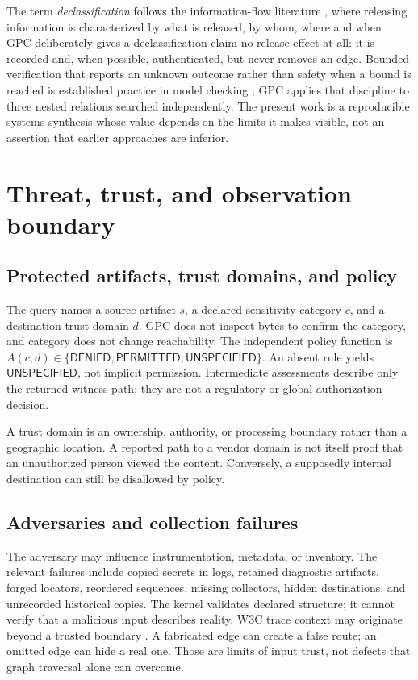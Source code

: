 \documentclass[11pt,letterpaper]{article}
\begin{document}
The term \emph{declassification} follows the information-flow literature \cite{denning,sabelfeldmyers}, where releasing information is characterized by what is released, by whom, where and when \cite{sabelfeldsands}. GPC deliberately gives a declassification claim no release effect at all: it is recorded and, when possible, authenticated, but never removes an edge. Bounded verification that reports an unknown outcome rather than safety when a bound is reached is established practice in model checking \cite{bmc}; GPC applies that discipline to three nested relations searched independently. The present work is a reproducible systems synthesis whose value depends on the limits it makes visible, not an assertion that earlier approaches are inferior.

\section{Threat, trust, and observation boundary}
\subsection{Protected artifacts, trust domains, and policy}
The query names a source artifact \(s\), a declared sensitivity category \(c\), and a destination trust domain \(d\). GPC does not inspect bytes to confirm the category, and category does not change reachability. The independent policy function is \(A(c,d)\in\{\mathsf{DENIED},\mathsf{PERMITTED},\mathsf{UNSPECIFIED}\}\). An absent rule yields \(\mathsf{UNSPECIFIED}\), not implicit permission. Intermediate assessments describe only the returned witness path; they are not a regulatory or global authorization decision.

A trust domain is an ownership, authority, or processing boundary rather than a geographic location. A reported path to a vendor domain is not itself proof that an unauthorized person viewed the content. Conversely, a supposedly internal destination can still be disallowed by policy.

\subsection{Adversaries and collection failures}
The adversary may influence instrumentation, metadata, or inventory. The relevant failures include copied secrets in logs, retained diagnostic artifacts, forged locators, reordered sequences, missing collectors, hidden destinations, and unrecorded historical copies. The kernel validates declared structure; it cannot verify that a malicious input describes reality. W3C trace context may originate beyond a trusted boundary \cite{w3ctrace}. A fabricated edge can create a false route; an omitted edge can hide a real one. Those are limits of input trust, not defects that graph traversal alone can overcome.
\end{document}

